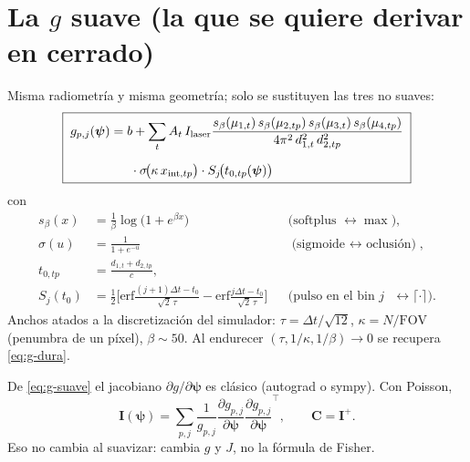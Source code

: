 \documentclass[11pt,a4paper]{article}
\newcommand{\vect}[1]{\boldsymbol{#1}}
\newcommand{\matr}[1]{\mathbf{#1}}
\theoremstyle{definition}
\begin{document}
\section{La $g$ suave (la que se quiere derivar en cerrado)}
\label{sec:suave}

Misma radiometr\'ia y misma geometr\'ia; solo se sustituyen las tres no suaves:
%
\begin{equation}
\label{eq:g-suave}
\boxed{\;
\begin{aligned}
g_{p,j}(\vect\psi)
&=
b
+
\sum_t
A_t\,
I_{\mathrm{laser}}
\frac
{s_\beta(\mu_{1,t})\,s_\beta(\mu_{2,tp})\,s_\beta(\mu_{3,t})\,s_\beta(\mu_{4,tp})}
{4\pi^2\,d_{1,t}^2\,d_{2,tp}^2}
\\[6pt]
&\hspace{1.6em}
\cdot
\sigma\!\bigl(\kappa\, x_{\mathrm{int},tp}\bigr)
\cdot
S_j\!\bigl(t_{0,tp}(\vect\psi)\bigr)
\end{aligned}
\;}
\end{equation}
%
con
%
\begin{align}
s_\beta(x)
&=\frac1\beta\log\bigl(1+e^{\beta x}\bigr)
&&\text{(softplus $\leftrightarrow\max$)},
\label{eq:softplus}\\[4pt]
\sigma(u)
&=\frac1{1+e^{-u}}
&&\text{(sigmoide $\leftrightarrow$ oclusi\'on)},
\label{eq:sig}\\[4pt]
t_{0,tp}
&=\frac{d_{1,t}+d_{2,tp}}{c},
\label{eq:t0}\\[4pt]
S_j(t_0)
&=\frac12\Big[
\mathrm{erf}\frac{(j+1)\Delta t-t_0}{\sqrt2\,\tau}
-
\mathrm{erf}\frac{j\Delta t-t_0}{\sqrt2\,\tau}
\Big]
&&\text{(pulso en el bin $j$ $\leftrightarrow\lceil\cdot\rceil$)}.
\label{eq:Sj}
\end{align}
%
Anchos atados a la discretizaci\'on del simulador:
$\tau=\Delta t/\sqrt{12}$, $\kappa=N/\mathrm{FOV}$ (penumbra de un p\'ixel),
$\beta\sim50$. Al endurecer $(\tau,1/\kappa,1/\beta)\to0$ se recupera
\eqref{eq:g-dura}.

De \eqref{eq:g-suave} el jacobiano $\partial g/\partial\vect\psi$ es cl\'asico
(autograd o sympy). Con Poisson,
%
\begin{equation}
\matr I(\vect\psi)
=
\sum_{p,j}
\frac1{g_{p,j}}
\frac{\partial g_{p,j}}{\partial\vect\psi}
\frac{\partial g_{p,j}}{\partial\vect\psi}^{\!\top},
\qquad
\matr C=\matr I^{+}.
\end{equation}
%
Eso no cambia al suavizar: cambia $g$ y $J$, no la f\'ormula de Fisher.

\end{document}
